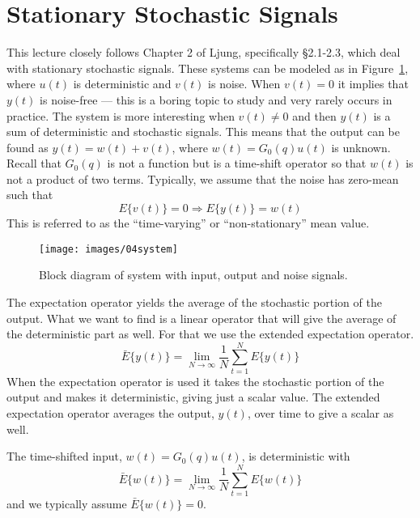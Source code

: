 \mainmatter%
\setcounter{page}{1}

\lectureseries[\course]{\course}

\date{October 6, 2009}

\setaddress%

\setcounter{lecture}{3}
\setcounter{chapter}{3}


\section{Stationary Stochastic Signals}
This lecture closely follows Chapter 2 of Ljung, specifically \S2.1-2.3, which deal with stationary stochastic signals.%
These systems can be modeled as in Figure~\ref{fig:04system}, where $u(t)$ is deterministic and $v(t)$ is noise.
When $v(t)=0$ it implies that $y(t)$ is noise-free --- this is a boring topic to study and very rarely occurs in practice.
The system is more interesting when $v(t)\neq 0$ and then $y(t)$ is a sum of deterministic and stochastic signals.
This means that the output can be found as $y(t)=w(t)+v(t)$, where $w(t)=G_0(q)u(t)$ is unknown.
Recall that $G_0(q)$ is not a function but is a time-shift operator so that $w(t)$ is not a product of two terms.
Typically, we assume that the noise has zero-mean such that
$$E\{v(t)\}=0 \Rightarrow E\{y(t)\}=w(t)$$
This is referred to as the ``time-varying'' or ``non-stationary'' mean value.
\begin{figure}[ht!]
\centering
\texttt{[image: images/04system]}
\caption{Block diagram of system with input, output and noise signals.}
\label{fig:04system}
\end{figure}

The expectation operator yields the average of the stochastic portion of the output.
What we want to find is a linear operator that will give the average of the deterministic part as well.
For that we use the extended expectation operator.
$$\bar{E}\{y(t)\} = \lim_{N\to\infty}\frac{1}{N}\sum_{t=1}^N E\{y(t)\}$$
When the expectation operator is used it takes the stochastic portion of the output and makes it deterministic, giving just a scalar value.
The extended expectation operator averages the output, $y(t)$, over time to give a scalar as well.

The time-shifted input, $w(t)=G_0(q)u(t)$, is deterministic with
$$\bar{E}\{w(t)\} = \lim_{N\to\infty}\frac{1}{N}\sum_{t=1}^N E\{w(t)\}$$
and we typically assume $\bar{E}\{w(t)\}=0$.

